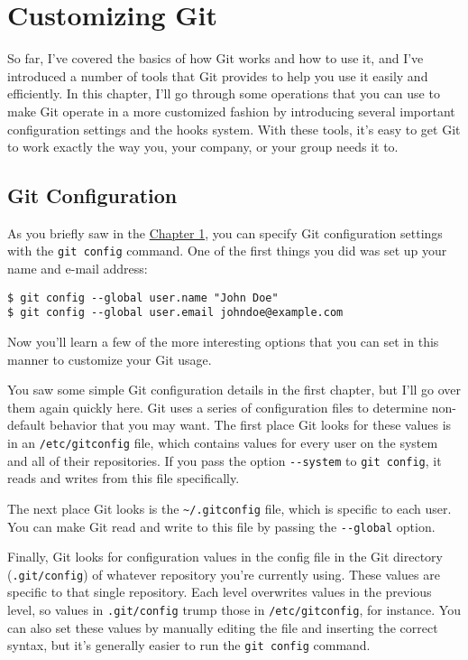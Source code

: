 \documentclass[a4paper]{book}
\newcommand{\prechap}{Chapter }
\newcommand{\postchap}{}
\newcommand{\chap}[1]{\newpage\thispagestyle{empty}\chapter{#1}\label{chap:\thechapter}}
\newcommand{\chapref}[1]{\hyperref[chap:#1]{\prechap #1\postchap}}
\begin{document}
\chap{Customizing Git}\label{customizing-git}

So far, I've covered the basics of how Git works and how to use it, and I've introduced a number of tools that Git provides to help you use it easily and efficiently. In this chapter, I'll go through some operations that you can use to make Git operate in a more customized fashion by introducing several important configuration settings and the hooks system. With these tools, it's easy to get Git to work exactly the way you, your company, or your group needs it to.

\section{Git Configuration}\label{git-configuration}

As you briefly saw in the \chapref{1}, you can specify Git configuration settings with the \texttt{git config} command. One of the first things you did was set up your name and e-mail address:

\begin{shaded}\begin{verbatim}
$ git config --global user.name "John Doe"
$ git config --global user.email johndoe@example.com
\end{verbatim}\end{shaded}

Now you'll learn a few of the more interesting options that you can set in this manner to customize your Git usage.

You saw some simple Git configuration details in the first chapter, but I'll go over them again quickly here. Git uses a series of configuration files to determine non-default behavior that you may want. The first place Git looks for these values is in an \texttt{/etc/gitconfig} file, which contains values for every user on the system and all of their repositories. If you pass the option \texttt{-{}-system} to \texttt{git config}, it reads and writes from this file specifically.

The next place Git looks is the \texttt{\textasciitilde{}/.gitconfig} file, which is specific to each user. You can make Git read and write to this file by passing the \texttt{-{}-global} option.

Finally, Git looks for configuration values in the config file in the Git directory (\texttt{.git/config}) of whatever repository you're currently using. These values are specific to that single repository. Each level overwrites values in the previous level, so values in \texttt{.git/config} trump those in \texttt{/etc/gitconfig}, for instance. You can also set these values by manually editing the file and inserting the correct syntax, but it's generally easier to run the \texttt{git config} command.
\end{document}

